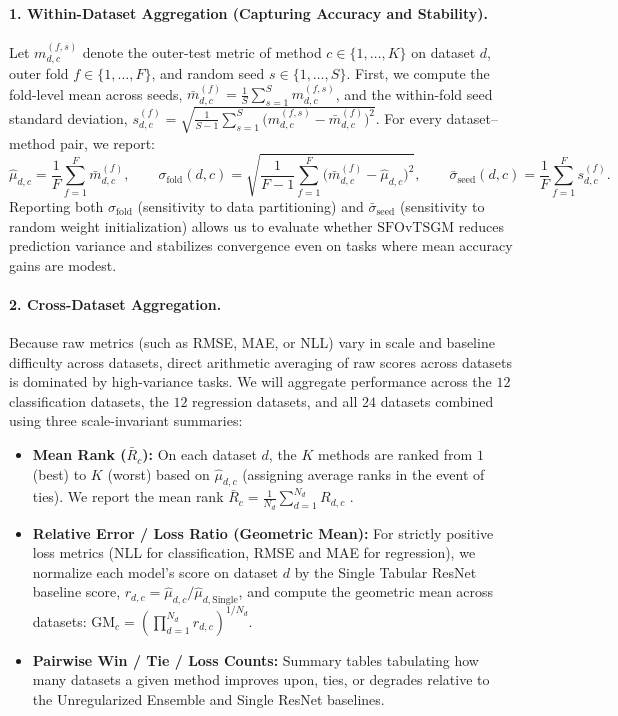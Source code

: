 \documentclass[11pt, a4paper]{article}
\begin{document}
\paragraph{1. Within-Dataset Aggregation (Capturing Accuracy and Stability).}
Let $m_{d,c}^{(f,s)}$ denote the outer-test metric of method $c \in \{1, \dots, K\}$ on dataset $d$, outer fold $f \in \{1, \dots, F\}$, and random seed $s \in \{1, \dots, S\}$. First, we compute the fold-level mean across seeds, $\bar{m}_{d,c}^{(f)} = \frac{1}{S}\sum_{s=1}^S m_{d,c}^{(f,s)}$, and the within-fold seed standard deviation, $s_{d,c}^{(f)} = \sqrt{\frac{1}{S-1}\sum_{s=1}^S \big(m_{d,c}^{(f,s)} - \bar{m}_{d,c}^{(f)}\big)^2}$. For every dataset--method pair, we report:
\begin{equation}
    \hat{\mu}_{d,c} = \frac{1}{F} \sum_{f=1}^{F} \bar{m}_{d,c}^{(f)}, \qquad 
    \sigma_{\text{fold}}(d,c) = \sqrt{\frac{1}{F-1} \sum_{f=1}^{F} \big(\bar{m}_{d,c}^{(f)} - \hat{\mu}_{d,c}\big)^2}, \qquad 
    \bar{\sigma}_{\text{seed}}(d,c) = \frac{1}{F} \sum_{f=1}^{F} s_{d,c}^{(f)}.
\end{equation}
Reporting both $\sigma_{\text{fold}}$ (sensitivity to data partitioning) and $\bar{\sigma}_{\text{seed}}$ (sensitivity to random weight initialization) allows us to evaluate whether $\text{SFOvTSGM}$ reduces prediction variance and stabilizes convergence even on tasks where mean accuracy gains are modest.

\paragraph{2. Cross-Dataset Aggregation.}
Because raw metrics (such as RMSE, MAE, or NLL) vary in scale and baseline difficulty across datasets, direct arithmetic averaging of raw scores across datasets is dominated by high-variance tasks. We will aggregate performance across the $12$ classification datasets, the $12$ regression datasets, and all $24$ datasets combined using three scale-invariant summaries:
\begin{itemize}
    \item \textbf{Mean Rank ($\bar{R}_c$):} On each dataset $d$, the $K$ methods are ranked from $1$ (best) to $K$ (worst) based on $\hat{\mu}_{d,c}$ (assigning average ranks in the event of ties). We report the mean rank $\bar{R}_c = \frac{1}{N_d} \sum_{d=1}^{N_d} R_{d,c}$ \cite{demsar2006statistical}.
    \item \textbf{Relative Error / Loss Ratio (Geometric Mean):} For strictly positive loss metrics (NLL for classification, RMSE and MAE for regression), we normalize each model's score on dataset $d$ by the Single Tabular ResNet baseline score, $r_{d,c} = \hat{\mu}_{d,c} / \hat{\mu}_{d,\text{Single}}$, and compute the geometric mean across datasets: $\text{GM}_c = \left(\prod_{d=1}^{N_d} r_{d,c}\right)^{1/N_d}$.
    \item \textbf{Pairwise Win / Tie / Loss Counts:} Summary tables tabulating how many datasets a given method improves upon, ties, or degrades relative to the Unregularized Ensemble and Single ResNet baselines.
\end{itemize}
\end{document}
